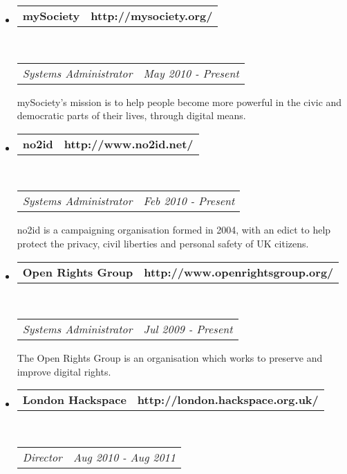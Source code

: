 \documentclass[10pt,a4paper]{article}
\makeatletter
\newcommand{\headerrow}[2]
{\begin{tabular*}{\linewidth}{l@{\extracolsep{\fill}}r}
	#1 &
	#2 \\
\end{tabular*}}
\makeatother
\begin{document}
\begin{itemize}
	\parskip=0.1em
	\item
	\headerrow
		{\textbf{mySociety}}
		{\textbf{http://mysociety.org/}}
	\\
	\headerrow
		{\emph{Systems Administrator}}
		{\emph{May 2010 - Present}}

		mySociety’s mission is to help people become more powerful in the civic and democratic parts of their lives, through digital means. 

	\item
	\headerrow
		{\textbf{no2id}}
		{\textbf{http://www.no2id.net/}}
	\\
	\headerrow
		{\emph{Systems Administrator}}
		{\emph{Feb 2010 - Present}}

		no2id is a campaigning organisation formed in 2004, with an edict to help protect the privacy, civil liberties and personal safety of UK citizens.	
	\item
	\headerrow
		{\textbf{Open Rights Group}}
		{\textbf{http://www.openrightsgroup.org/}}
	\\
	\headerrow
		{\emph{Systems Administrator}}
		{\emph{Jul 2009 - Present}}

		The Open Rights Group is an organisation which works to preserve and improve digital rights.

	\item
	\headerrow
		{\textbf{London Hackspace}}
		{\textbf{http://london.hackspace.org.uk/}}
	\\
	\headerrow
		{\emph{Director}}
		{\emph{Aug 2010 - Aug 2011}}


\end{itemize}
\end{document}
